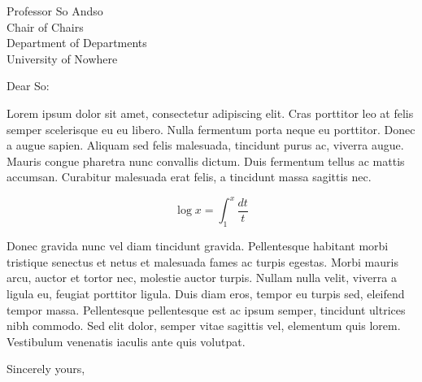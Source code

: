 \documentclass[letterpaper]{mscsletter}
\begin{document}
\begin{letter}{
Professor So Andso\\
Chair of Chairs\\
Department of Departments\\
University of Nowhere\\
}

\opening{Dear So:}

Lorem ipsum dolor sit amet, consectetur adipiscing elit. Cras
porttitor leo at felis semper scelerisque eu eu libero. Nulla
fermentum porta neque eu porttitor. Donec a augue sapien. Aliquam sed
felis malesuada, tincidunt purus ac, viverra augue. Mauris congue
pharetra nunc convallis dictum. Duis fermentum tellus ac mattis
accumsan. Curabitur malesuada erat felis, a tincidunt massa sagittis
nec.

$$\log x = \int_1^x\frac{dt}{t}$$

Donec gravida nunc vel diam tincidunt gravida. Pellentesque habitant
morbi tristique senectus et netus et malesuada fames ac turpis
egestas. Morbi mauris arcu, auctor et tortor nec, molestie auctor
turpis. Nullam nulla velit, viverra a ligula eu, feugiat porttitor
ligula. Duis diam eros, tempor eu turpis sed, eleifend tempor
massa. Pellentesque pellentesque est ac ipsum semper, tincidunt
ultrices nibh commodo. Sed elit dolor, semper vitae sagittis vel,
elementum quis lorem. Vestibulum venenatis iaculis ante quis
volutpat.

\closing{Sincerely yours,}

\end{letter}
\end{document}
